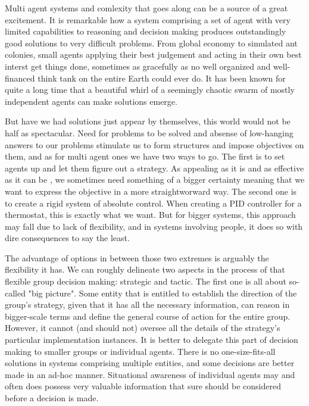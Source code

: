 Multi agent systems and comlexity that goes along can be a source of a great excitement. It is remarkable how a system
comprising a set of agent with very limited capabilities to reasoning and decision making produces outstandingly good
solutions to very difficult problems. From global economy to simulated ant colonies, small agents applying their best
judgement and acting in their own best interst get things done, sometimes as gracefully as no well organized and
well-financed think tank on the entire Earth could ever do. It has been known for quite a long time that a beautiful
whirl of a seemingly chaotic swarm of mostly independent agents can make solutions emerge.

But have we had solutions just appear by themselves, this world would not be half as spectacular. Need for problems to
be solved and absense of low-hanging answers to our problems stimulate us to form structures and impose objectives on
them, and as for multi agent ones we have two ways to go. The first is to set agents up and let them figure out a
strategy. As appealing as it is and as
effective as it can be \cite{dorigo-2006}, we sometimes need something of a bigger certainty meaning that we want to
express the objective in a more straightworward way. The second one is to create a rigid system of absolute control.
When creating a PID controller for a thermostat, this is exactly what we want. But for bigger systems, this approach may
fall due to lack of flexibility, and in systems involving people, it does so with dire consequences to say the least.

The advantage of options in between those two extremes is arguably the flexibility it has. We can roughly delineate two
aspects in the process of that flexible group decision making: strategic and tactic. The first one is all about
so-called "big picture". Some entity that is entitled to establish the direction of the group's strategy, given that it
has all the necessary information, can reason in bigger-scale terms and define the general course of action for the
entire group. However, it cannot (and should not) oversee all the details of the strategy's particular implementation
instances. It is better to delegate this part of decision making to smaller groups or individual agents. There is no
one-size-fits-all solutions in systems comprising multiple entities, and some decisions are better made in an ad-hoc
manner.
Situational awareness of individual agents may and often does possess very valuable information that sure should be
considered before a decision is made.

